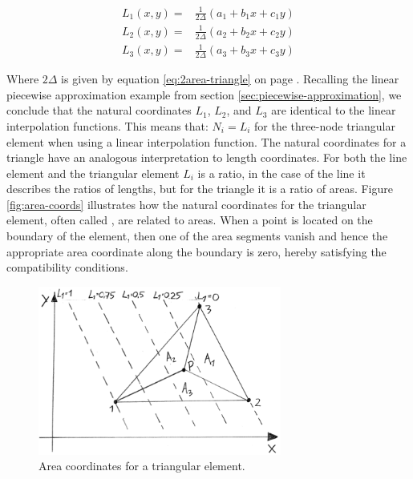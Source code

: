 \begin{equation}
\label{eq:local-coordinates-of-triangle}
\begin{aligned}
L_1 (x,y) =& \frac{1}{2 \Delta} (a_1 + b_1 x + c_1 y) \\
L_2 (x,y) =& \frac{1}{2 \Delta} (a_2 + b_2 x + c_2 y) \\
L_3 (x,y) =& \frac{1}{2 \Delta} (a_3 + b_3 x + c_3 y)
\end{aligned}
\end{equation}

Where $2 \Delta$ is given by equation \eqref{eq:2area-triangle} on
page \pageref{eq:2area-triangle}.
%
Recalling the linear piecewise approximation example from section
\vref{sec:piecewise-approximation}, we conclude that the natural coordinates
$L_1$, $L_2$, and $L_3$ are identical to the linear interpolation
functions. This means that: $N_i = L_i$ for the
three-node triangular element when using a linear interpolation function.
The natural coordinates for a triangle have an analogous
interpretation to length coordinates. For both the line element and
the triangular element $L_i$ is a ratio, in the case of the line it
describes the ratios of lengths, but for the triangle it is a ratio
of areas. Figure \vref{fig:area-coords} illustrates how the natural
coordinates for the triangular element, often called
, are related to areas. When a point is
located on the boundary of the 
element, then one of the area segments vanish and hence the
appropriate area coordinate along the boundary is zero, hereby
satisfying the compatibility conditions.

\begin{figure}
  \centering
  \includegraphics[width=8cm]{./images/finite_element_method_area_coords.png}
\caption{Area coordinates for a triangular element.}
\label{fig:area-coords}
\end{figure}




